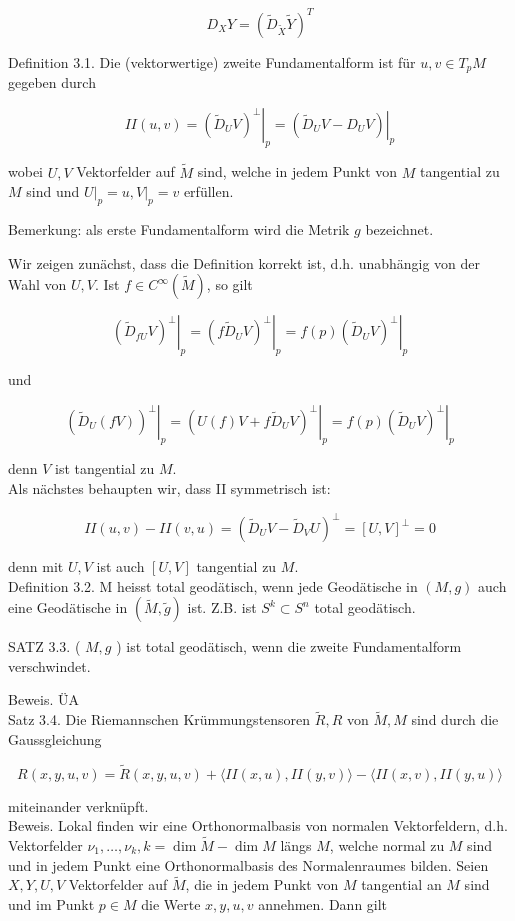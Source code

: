 \documentclass[10pt, letterpaper]{article}
\begin{document}
$$
D_{X} Y=\left(\tilde{D}_{\tilde{X}} \tilde{Y}\right)^{T}
$$

Definition 3.1. Die (vektorwertige) zweite Fundamentalform ist für $u, v \in T_{p} M$ gegeben durch

$$
I I(u, v)=\left.\left(\tilde{D}_{U} V\right)^{\perp}\right|_{p}=\left.\left(\tilde{D}_{U} V-D_{U} V\right)\right|_{p}
$$

wobei $U, V$ Vektorfelder auf $\tilde{M}$ sind, welche in jedem Punkt von $M$ tangential zu $M$ sind und $\left.U\right|_{p}=u,\left.V\right|_{p}=v$ erfüllen.

Bemerkung: als erste Fundamentalform wird die Metrik $g$ bezeichnet.

Wir zeigen zunächst, dass die Definition korrekt ist, d.h. unabhängig von der Wahl von $U, V$. Ist $f \in C^{\infty}(\tilde{M})$, so gilt

$$
\left.\left(\tilde{D}_{f U} V\right)^{\perp}\right|_{p}=\left.\left(f \tilde{D}_{U} V\right)^{\perp}\right|_{p}=\left.f(p)\left(\tilde{D}_{U} V\right)^{\perp}\right|_{p}
$$

und

$$
\left.\left(\tilde{D}_{U}(f V)\right)^{\perp}\right|_{p}=\left.\left(U(f) V+f \tilde{D}_{U} V\right)^{\perp}\right|_{p}=\left.f(p)\left(\tilde{D}_{U} V\right)^{\perp}\right|_{p}
$$

denn $V$ ist tangential zu $M$.\\
Als nächstes behaupten wir, dass II symmetrisch ist:

$$
I I(u, v)-I I(v, u)=\left(\tilde{D}_{U} V-\tilde{D}_{V} U\right)^{\perp}=[U, V]^{\perp}=0
$$

denn mit $U, V$ ist auch $[U, V]$ tangential zu $M$.\\
Definition 3.2. M heisst total geodätisch, wenn jede Geodätische in $(M, g)$ auch eine Geodätische in $(\tilde{M}, \tilde{g})$ ist. Z.B. ist $S^{k} \subset S^{n}$ total geodätisch.

SATZ 3.3. ( $M, g$ ) ist total geodätisch, wenn die zweite Fundamentalform verschwindet.

Beweis. ÜA\\
Satz 3.4. Die Riemannschen Krümmungstensoren $\tilde{R}, R$ von $\tilde{M}, M$ sind durch die Gaussgleichung

$$
R(x, y, u, v)=\tilde{R}(x, y, u, v)+\langle I I(x, u), I I(y, v)\rangle-\langle I I(x, v), I I(y, u)\rangle
$$

miteinander verknüpft.\\
Beweis. Lokal finden wir eine Orthonormalbasis von normalen Vektorfeldern, d.h. Vektorfelder $\nu_{1}, \ldots, \nu_{k}, k=\operatorname{dim} \tilde{M}-\operatorname{dim} M$ längs $M$, welche normal zu $M$ sind und in jedem Punkt eine Orthonormalbasis des Normalenraumes bilden. Seien $X, Y, U, V$ Vektorfelder auf $\tilde{M}$, die in jedem Punkt von $M$ tangential an $M$ sind und im Punkt $p \in M$ die Werte $x, y, u, v$ annehmen. Dann gilt
\end{document}
